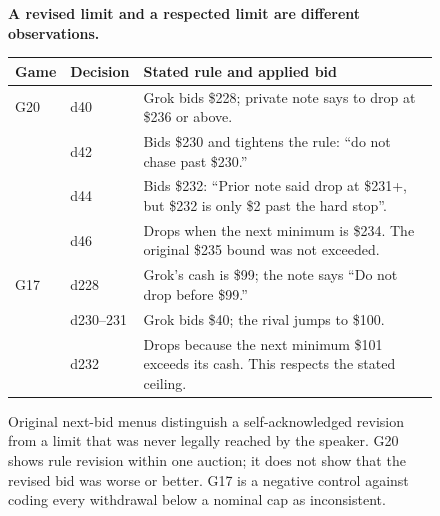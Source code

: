 \begin{figure}[p]
\centering
\begin{minipage}{0.95\linewidth}
\textbf{A revised limit and a respected limit are different observations.}\par\smallskip
\begin{tabularx}{\linewidth}{@{}llX@{}}
\toprule
Game & Decision & Stated rule and applied bid\\
\midrule
G20 & d40 & Grok bids \$228; private note says to drop at \$236 or above.\\
 & d42 & Bids \$230 and tightens the rule: ``do not chase past \$230.''\\
 & d44 & Bids \$232: ``Prior note said drop at \$231+, but \$232 is only \$2 past the hard stop''.\\
 & d46 & Drops when the next minimum is \$234. The original \$235 bound was not exceeded.\\
\midrule
G17 & d228 & Grok's cash is \$99; the note says ``Do not drop before \$99.''\\
 & d230--231 & Grok bids \$40; the rival jumps to \$100.\\
 & d232 & Drops because the next minimum \$101 exceeds its cash. This respects the stated ceiling.\\
\bottomrule
\end{tabularx}
\end{minipage}
\caption{Original next-bid menus distinguish a self-acknowledged revision from a limit that was never legally reached by the speaker. G20 shows rule revision within one auction; it does not show that the revised bid was worse or better. G17 is a negative control against coding every withdrawal below a nominal cap as inconsistent.}
\label{fig:temporal-revision}
\end{figure}
